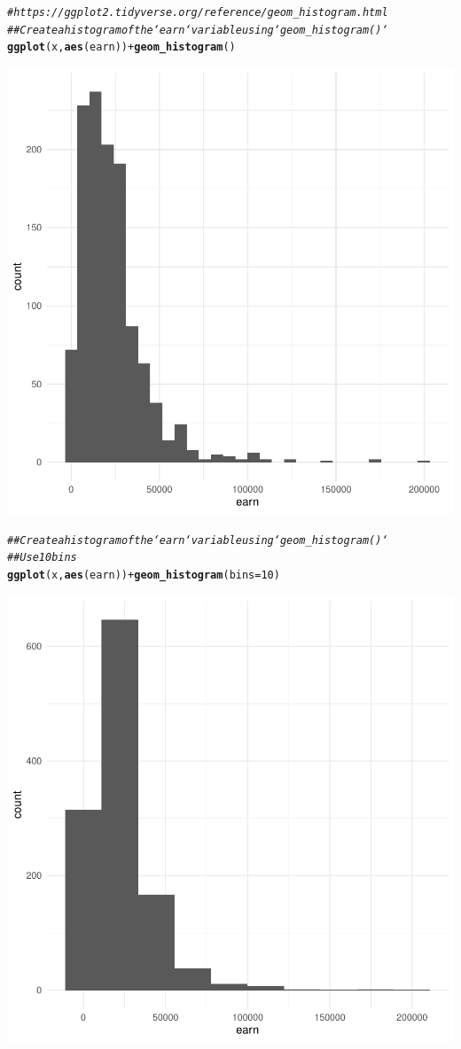 \documentclass{article}\usepackage[]{graphicx}\usepackage[]{xcolor}
\makeatletter
\newcommand{\hlnum}[1]{\textcolor[rgb]{0.686,0.059,0.569}{#1}}%
\newcommand{\hlcom}[1]{\textcolor[rgb]{0.678,0.584,0.686}{\textit{#1}}}%
\newcommand{\hlopt}[1]{\textcolor[rgb]{0,0,0}{#1}}%
\newcommand{\hlstd}[1]{\textcolor[rgb]{0.345,0.345,0.345}{#1}}%
\newcommand{\hlkwc}[1]{\textcolor[rgb]{0.333,0.667,0.333}{#1}}%
\newcommand{\hlkwd}[1]{\textcolor[rgb]{0.737,0.353,0.396}{\textbf{#1}}}%
\newenvironment{kframe}{%
 \def\at@end@of@kframe{}%
 \ifinner\ifhmode%
  \def\at@end@of@kframe{\end{minipage}}%
  \begin{minipage}{\columnwidth}%
 \fi\fi%
 \def\FrameCommand##1{\hskip\@totalleftmargin \hskip-\fboxsep
 \colorbox{shadecolor}{##1}\hskip-\fboxsep
     \hskip-\linewidth \hskip-\@totalleftmargin \hskip\columnwidth}%
 \MakeFramed {\advance\hsize-\width
   \@totalleftmargin\z@ \linewidth\hsize
   \@setminipage}}%
 {\par\unskip\endMakeFramed%
 \at@end@of@kframe}
\newenvironment{knitrout}{}{} %
\makeatother
\begin{document}
\begin{knitrout}
{}


\begin{kframe}\begin{alltt}
\hlcom{# https://ggplot2.tidyverse.org/reference/geom_histogram.html}
\hlcom{## Create a histogram of the `earn` variable using `geom_histogram()`}
\hlkwd{ggplot}\hlstd{(x,} \hlkwd{aes}\hlstd{(earn))} \hlopt{+} \hlkwd{geom_histogram}\hlstd{()}
\end{alltt}


{\ttfamily\noindent\itshape\color{messagecolor}{\#\# `stat\_bin()` using `bins = 30`. Pick better value with `binwidth`.}}\end{kframe}

{\centering \includegraphics[width=.6\linewidth]{figure/assignment-03-SyversonLuke-Rnwauto-report-9} 

}


\begin{kframe}\begin{alltt}
\hlcom{## Create a histogram of the `earn` variable using `geom_histogram()`}
\hlcom{## Use 10 bins}
\hlkwd{ggplot}\hlstd{(x,} \hlkwd{aes}\hlstd{(earn))} \hlopt{+} \hlkwd{geom_histogram}\hlstd{(}\hlkwc{bins} \hlstd{=} \hlnum{10}\hlstd{)}
\end{alltt}
\end{kframe}

{\centering \includegraphics[width=.6\linewidth]{figure/assignment-03-SyversonLuke-Rnwauto-report-10} 

}
\end{knitrout}
\end{document}

